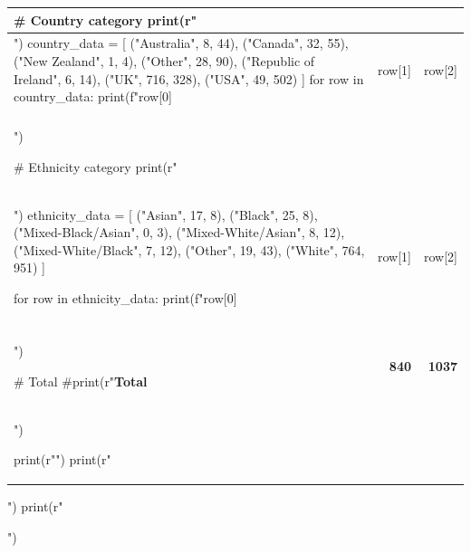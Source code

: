 \documentclass{article}
\begin{document}
\begin{pycode}
\begin{table}[h!]
\begin{tabular}{|l|r|r|}
# Country category
print(r"\multicolumn{3}{|l|}{\textbf{Country category}} \\ \hline")
country_data = [
    ("Australia", 8, 44),
    ("Canada", 32, 55),
    ("New Zealand", 1, 4),
    ("Other", 28, 90),
    ("Republic of Ireland", 6, 14),
    ("UK", 716, 328),
    ("USA", 49, 502)
    ]
for row in country_data:
    print(f"{row[0]} & {row[1]} & {row[2]} \\\\ \hline")

# Ethnicity category
print(r"\multicolumn{3}{|l|}{\textbf{Ethnicity category}} \\ \hline")
ethnicity_data = [
    ("Asian", 17, 8),
    ("Black", 25, 8),
    ("Mixed-Black/Asian", 0, 3),
    ("Mixed-White/Asian", 8, 12),
    ("Mixed-White/Black", 7, 12),
    ("Other", 19, 43),
    ("White", 764, 951)
    ]

for row in ethnicity_data:
    print(f"{row[0]} & {row[1]} & {row[2]} \\\\ \hline")

# Total
#print(r"\textbf{Total} & \textbf{840} & \textbf{1037} \\ \hline")

print(r"\bottomrule")
print(r"\end{tabular}")
print(r"\end{table}")
\end{pycode}
\end{document}
